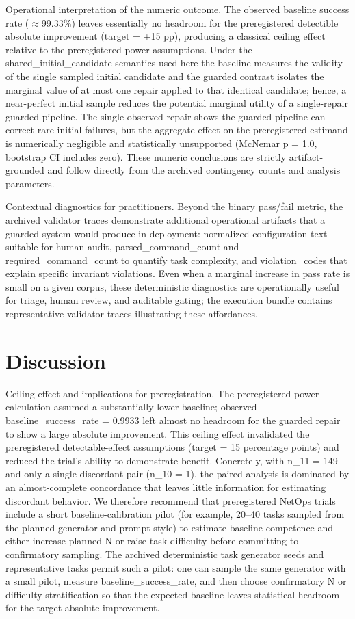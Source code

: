 \documentclass[conference]{IEEEtran}
\begin{document}
Operational interpretation of the numeric outcome. The observed baseline success rate (\ensuremath{\approx}99.33\%) leaves essentially no headroom for the preregistered detectible absolute improvement (target = +15 pp), producing a classical ceiling effect relative to the preregistered power assumptions. Under the shared\_initial\_candidate semantics used here the baseline measures the validity of the single sampled initial candidate and the guarded contrast isolates the marginal value of at most one repair applied to that identical candidate; hence, a near-perfect initial sample reduces the potential marginal utility of a single-repair guarded pipeline. The single observed repair shows the guarded pipeline can correct rare initial failures, but the aggregate effect on the preregistered estimand is numerically negligible and statistically unsupported (McNemar p = 1.0, bootstrap CI includes zero). These numeric conclusions are strictly artifact-grounded and follow directly from the archived contingency counts and analysis parameters.

Contextual diagnostics for practitioners. Beyond the binary pass/fail metric, the archived validator traces demonstrate additional operational artifacts that a guarded system would produce in deployment: normalized configuration text suitable for human audit, parsed\_command\_count and required\_command\_count to quantify task complexity, and violation\_codes that explain specific invariant violations. Even when a marginal increase in pass rate is small on a given corpus, these deterministic diagnostics are operationally useful for triage, human review, and auditable gating; the execution bundle contains representative validator traces illustrating these affordances.

\section{Discussion}
Ceiling effect and implications for preregistration. The preregistered power calculation assumed a substantially lower baseline; observed baseline\_success\_rate = 0.9933 left almost no headroom for the guarded repair to show a large absolute improvement. This ceiling effect invalidated the preregistered detectable-effect assumptions (target = 15 percentage points) and reduced the trial's ability to demonstrate benefit. Concretely, with n\_11 = 149 and only a single discordant pair (n\_10 = 1), the paired analysis is dominated by an almost-complete concordance that leaves little information for estimating discordant behavior. We therefore recommend that preregistered NetOps trials include a short baseline-calibration pilot (for example, 20--40 tasks sampled from the planned generator and prompt style) to estimate baseline competence and either increase planned N or raise task difficulty before committing to confirmatory sampling. The archived deterministic task generator seeds and representative tasks permit such a pilot: one can sample the same generator with a small pilot, measure baseline\_success\_rate, and then choose confirmatory N or difficulty stratification so that the expected baseline leaves statistical headroom for the target absolute improvement.
\end{document}
